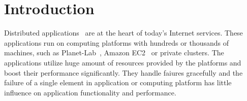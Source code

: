 \section{Introduction}


Distributed applications~\cite{Ghemawat2003, DeCandia2007}
are at the heart of today's Internet services. These
applications run on computing platforms with hundreds or
thousands of machines, such as Planet-Lab~\cite{Bavier2004},
Amazon EC2~\cite{Garfinkel2007} or private clusters. The
applications utilize huge amount of resources provided by
the platforms and boost their performance significantly.
They handle faiures gracefully and the failure of a single
element in application or computing platform has little
influence on application functionality and performance.






